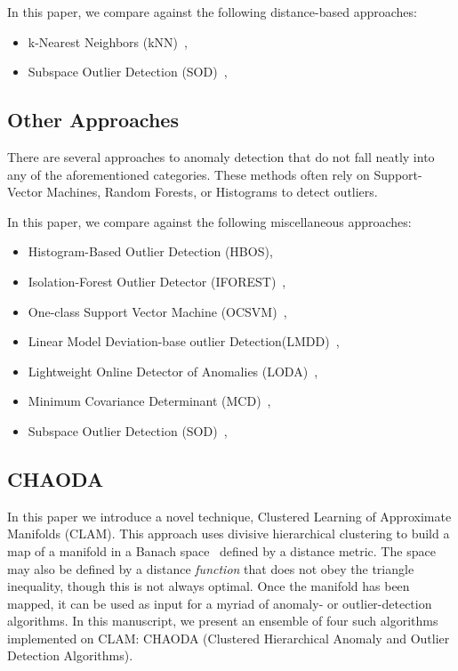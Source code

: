 In this paper, we compare against the following distance-based approaches:
\begin{itemize}
    \item k-Nearest Neighbors (kNN)~\cite{ramaswamy2000efficient, sridhar2000knn, fabrizio2002knn},
    \item Subspace Outlier Detection (SOD)~\cite{kriegel2009sod},
\end{itemize}


\subsection{Other Approaches}
\label{subsec:introduction:other-appraoches}

There are several approaches to anomaly detection that do not fall neatly into any of the aforementioned categories.
These methods often rely on Support-Vector Machines, Random Forests, or Histograms to detect outliers.

In this paper, we compare against the following miscellaneous approaches:
\begin{itemize}
    \item Histogram-Based Outlier Detection (HBOS)\cite{goldstein2012hbos},
    \item Isolation-Forest Outlier Detector (IFOREST)~\cite{tony2008iforest,tony2012iforest},
    \item One-class Support Vector Machine (OCSVM)~\cite{sholkopf2001ocsvm},
    \item Linear Model Deviation-base outlier Detection(LMDD)~\cite{arning1996lmdd},
    \item Lightweight Online Detector of Anomalies (LODA)~\cite{pevny2016loda},
    \item Minimum Covariance Determinant (MCD)~\cite{rousseeuw1999mcd,hardin2004mcd},
    \item Subspace Outlier Detection (SOD)~\cite{kriegel2009sod},
\end{itemize}


\subsection{CHAODA}
\label{subsec:introduction:chaoda}

In this paper we introduce a novel technique, Clustered Learning of Approximate Manifolds (CLAM).
This approach uses divisive hierarchical clustering to build a map of a manifold in a Banach space~\cite{banach1929fonctionnelles} defined by a distance metric.
The space may also be defined by a distance \textit{function} that does not obey the triangle inequality, though this is not always optimal.
Once the manifold has been mapped, it can be used as input for a myriad of anomaly- or outlier-detection algorithms.
In this manuscript, we present an ensemble of four such algorithms implemented on CLAM: CHAODA (Clustered Hierarchical Anomaly and Outlier Detection Algorithms).

